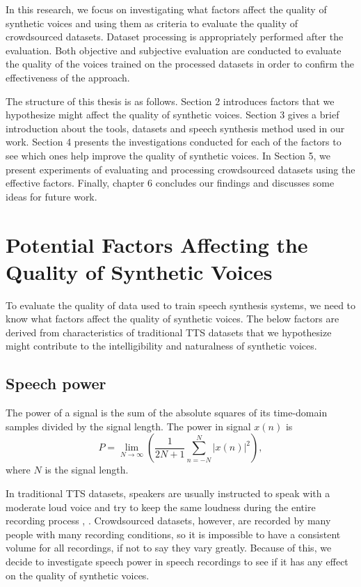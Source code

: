 \documentclass[12pt]{article}
\begin{document}
In this research, we focus on investigating what factors affect the quality of synthetic voices and using them as criteria to evaluate the quality of crowdsourced datasets. Dataset processing is appropriately performed after the evaluation. Both objective and subjective evaluation are conducted to evaluate the quality of the voices trained on the processed datasets in order to confirm the effectiveness of the approach.

The structure of this thesis is as follows. Section 2 introduces factors that we hypothesize might affect the quality of synthetic voices. Section 3 gives a brief introduction about the tools, datasets and speech synthesis method used in our work. Section 4 presents the investigations conducted for each of the factors to see which ones help improve the quality of synthetic voices. In Section 5, we present experiments of evaluating and processing crowdsourced datasets using the effective factors. Finally, chapter 6 concludes our findings and discusses some ideas for future work.
 

\clearpage
\section{Potential Factors Affecting the Quality of Synthetic Voices}\label{sec_potentialFactors}
To evaluate the quality of data used to train speech synthesis systems, we need to know what factors affect the quality of synthetic voices. The below factors are derived from characteristics of traditional TTS datasets that we hypothesize might contribute to the intelligibility and naturalness of synthetic voices.

\subsection{Speech power}\label{subsec_speechPower}
The power of a signal is the sum of the absolute squares of its time-domain samples divided by the signal length. The power in signal $x(n)$ is
\begin{equation}\label{exp_power}
    P = \lim_{N\to\infty} (\frac{1}{2N+1}\sum_{n=-N}^{N} |x(n)|^2),
\end{equation}
where $N$ is the signal length.

In traditional TTS datasets, speakers are usually instructed to speak with a moderate loud voice and try to keep the same loudness during the entire recording process \cite{corpusRecording}, \cite{buildingCorpus}. Crowdsourced datasets, however, are recorded by many people with many recording conditions, so it is impossible to have a consistent volume for all recordings, if not to say they vary greatly. Because of this, we decide to investigate speech power in speech recordings to see if it has any effect on the quality of synthetic voices.
\end{document}
